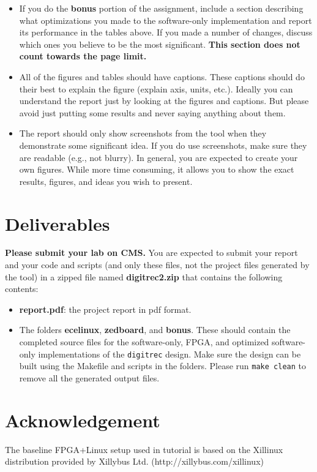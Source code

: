 \documentclass[paper=letter, fontsize=10pt]{scrartcl} %
\numberwithin{equation}{section} %
\numberwithin{figure}{section} %
\numberwithin{table}{section} %
\begin{document}
\begin{itemize}
\item If you do the \textbf{bonus} portion of the assignment, include a section describing what optimizations you made to the software-only implementation and report its performance in the tables above. If you made a number of changes, discuss which ones you believe to be the most significant. \textbf{This section does not count towards the page limit.}
  
\item All of the figures and tables should have captions. These captions should do their best to  explain the figure (explain axis, units, etc.). Ideally you can understand the report just by looking at the figures and captions. But please avoid just putting some results and never saying anything about them.

\item The report should only show screenshots from the tool when they demonstrate some significant idea. If you do use screenshots, make sure they are readable (e.g., not blurry). In general, you are expected to create your own figures. While more time consuming, it allows you to show the exact results, figures, and ideas you wish to present.
\end{itemize}

\section{Deliverables}
\label{deliverables}
\textbf{Please submit your lab on CMS.} You are expected to submit your report and your code and scripts (and only these files, not the project files generated by the tool) in a zipped file named \textbf{digitrec2.zip} that contains the following contents:
\begin{itemize}
    \item \textbf{report.pdf}: the project report in pdf format.
    \item The folders \textbf{ecelinux}, \textbf{zedboard}, and \textbf{bonus}. 
      These should contain the completed source files
      for the software-only, FPGA, and optimized software-only implementations of the \texttt{digitrec} design.
      Make sure the design can be built using the Makefile and scripts in the folders.
      Please run \texttt{make clean} to remove all the generated output files.
\end{itemize}

\section{Acknowledgement}
The baseline FPGA+Linux setup used in tutorial is based on the Xillinux distribution provided by Xillybus Ltd. (http://xillybus.com/xillinux)
\end{document}
